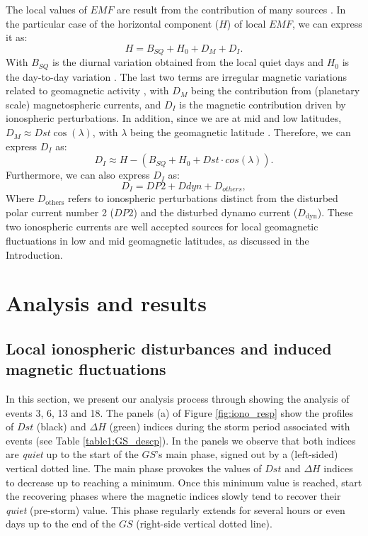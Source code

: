 \documentclass[a4paper,fleqn]{cas-dc}
\begin{document}
The local values of $EMF$ are result from the contribution of many sources \citep{1969intro_to_iono_p, l_handbook_geof_sw_Geom_field,  baseline_Gjerloev, vanKampt}. In the particular case of the horizontal component ($H$) of local $EMF$, we can express it as:
\begin{equation}
    \label{eq:1}
    H = B_{SQ} + H_0 + D_{M} + D_{I}.
\end{equation}
With $B_{SQ}$ is the diurnal variation obtained from the local quiet days \citep{vanKampt} and $H_0$ is the day-to-day variation \citep{baseline_Gjerloev, vanKampt}. The last two terms are irregular magnetic variations related to geomagnetic activity \citep{ddyn2005, angeoddyn}, with $D_M$ being the contribution from (planetary scale) magnetospheric currents, and $D_I$ is the magnetic contribution driven by ionospheric perturbations. In addition, since we are at mid and low latitudes, $D_M \approx Dst \cos(\lambda)$, with $\lambda$ being the geomagnetic latitude \citep{amorymazaudier_2017}. Therefore, we can express $D_I$ as: 
\begin{equation}
\label{eq:diono}
   D_{I} \approx H -(B_{SQ} +  H_0 + Dst \cdot cos(\lambda)).
\end{equation}
Furthermore, we can also express $D_{I}$ as:
\begin{equation}
\label{eq:diono_explicit}
   D_{I} = DP2 + Ddyn + D_{others},
\end{equation}
Where $D_{\text{others}}$ refers to ionospheric perturbations distinct from the disturbed polar current number 2 ($DP2$) and the disturbed dynamo current ($D_{\text{dyn}}$). These two ionospheric currents are well accepted sources for local geomagnetic fluctuations in low and mid geomagnetic latitudes, as discussed in the Introduction.


\section{Analysis and results}
\label{results}

\subsection{Local ionospheric disturbances and induced magnetic fluctuations}
\label{analysis}
In this section, we present our analysis process through showing the analysis of events 3, 6, 13 and 18. The panels (a) of Figure \ref{fig:iono_resp} show the profiles of $Dst$ (black) and $\Delta H$ (green) indices during the storm period associated with events (see Table \ref{table1:GS_descp}). In the panels we observe that both indices are \emph{quiet} up to the start of the $GS$'s main phase, signed out by a (left-sided) vertical dotted line. The main phase provokes the values of $Dst$ and $\Delta H$ indices to decrease up to reaching a minimum. Once this minimum value is reached, start the recovering phases where the magnetic indices slowly tend to recover their \emph{quiet} (pre-storm) value. This phase regularly extends for several hours or even days up to the end of the $GS$ (right-side vertical dotted line).  
\end{document}

